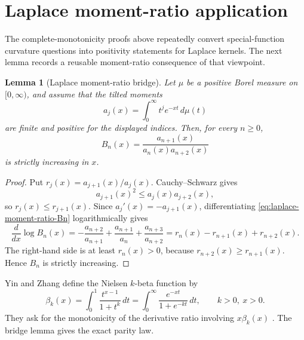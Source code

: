 \documentclass[11pt]{article}
\numberwithin{equation}{section}
\newtheorem{lemma}[theorem]{Lemma}
\theoremstyle{definition}
\theoremstyle{remark}
\newcommand{\1}{\mathbf 1}
\begin{document}
\section{Laplace moment-ratio application}
\label{sec:laplace-moment-ratio-application}

The complete-monotonicity proofs above repeatedly convert special-function curvature questions into positivity statements for Laplace kernels.  The next lemma records a reusable moment-ratio consequence of that viewpoint.

\begin{lemma}[Laplace moment-ratio bridge]
\label{lem:laplace-moment-ratio-bridge}
Let \(\mu\) be a positive Borel measure on \([0,\infty)\), and assume that the tilted moments
\begin{equation}
\label{eq:laplace-moment-ratio-aj}
a_j(x)=\int_0^\infty t^j e^{-xt}\,d\mu(t)
\end{equation}
are finite and positive for the displayed indices.  Then, for every \(n\ge0\),
\begin{equation}
\label{eq:laplace-moment-ratio-Bn}
B_n(x)=\frac{a_{n+1}(x)}{a_n(x)a_{n+2}(x)}
\end{equation}
is strictly increasing in \(x\).
\end{lemma}

\begin{proof}
Put \(r_j(x)=a_{j+1}(x)/a_j(x)\).  Cauchy--Schwarz gives
\begin{equation}
\label{eq:laplace-moment-log-convexity}
a_{j+1}(x)^2\le a_j(x)a_{j+2}(x),
\end{equation}
so \(r_j(x)\le r_{j+1}(x)\).  Since \(a_j'(x)=-a_{j+1}(x)\), differentiating \eqref{eq:laplace-moment-ratio-Bn} logarithmically gives
\begin{equation}
\label{eq:laplace-moment-ratio-derivative}
\frac{d}{dx}\log B_n(x)
=-\frac{a_{n+2}}{a_{n+1}}
+\frac{a_{n+1}}{a_n}
+\frac{a_{n+3}}{a_{n+2}}
=r_n(x)-r_{n+1}(x)+r_{n+2}(x).
\end{equation}
The right-hand side is at least \(r_n(x)>0\), because \(r_{n+2}(x)\ge r_{n+1}(x)\).  Hence \(B_n\) is strictly increasing.
\end{proof}

Yin and Zhang define the Nielsen \(k\)-beta function by
\begin{equation}
\label{eq:nielsen-k-beta-definition}
\beta_k(x)=\int_0^1\frac{t^{x-1}}{1+t^k}\,dt
=\int_0^\infty\frac{e^{-xt}}{1+e^{-kt}}\,dt,
\qquad k>0,\ x>0.
\end{equation}
They ask for the monotonicity of the derivative ratio involving \(x\beta_k(x)\) \cite{yin-zhang-k-beta}.  The bridge lemma gives the exact parity law.
\end{document}
